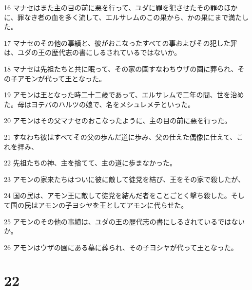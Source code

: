 \par 16 マナセはまた主の目の前に悪を行って、ユダに罪を犯させたその罪のほかに、罪なき者の血を多く流して、エルサレムのこの果から、かの果にまで満たした。
\par 17 マナセのその他の事績と、彼がおこなったすべての事およびその犯した罪は、ユダの王の歴代志の書にしるされているではないか。
\par 18 マナセは先祖たちと共に眠って、その家の園すなわちウザの園に葬られ、その子アモンが代って王となった。
\par 19 アモンは王となった時二十二歳であって、エルサレムで二年の間、世を治めた。母はヨテバのハルツの娘で、名をメシュレメテといった。
\par 20 アモンはその父マナセのおこなったように、主の目の前に悪を行った。
\par 21 すなわち彼はすべてその父の歩んだ道に歩み、父の仕えた偶像に仕えて、これを拝み、
\par 22 先祖たちの神、主を捨てて、主の道に歩まなかった。
\par 23 アモンの家来たちはついに彼に敵して徒党を結び、王をその家で殺したが、
\par 24 国の民は、アモン王に敵して徒党を結んだ者をことごとく撃ち殺した。そして国の民はアモンの子ヨシヤを王としてアモンに代らせた。
\par 25 アモンのその他の事績は、ユダの王の歴代志の書にしるされているではないか。
\par 26 アモンはウザの園にある墓に葬られ、その子ヨシヤが代って王となった。

\chapter{22}

